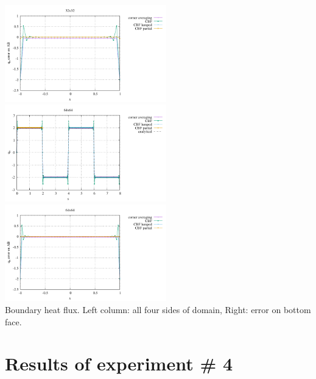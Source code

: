 \begin{center}
\includegraphics[width=7cm]{python_codes/fieldstone_173/results/exp3/heat_flux_boundary_bottom_32.pdf}\\
\includegraphics[width=7cm]{python_codes/fieldstone_173/results/exp3/heat_flux_boundary_64.pdf}
\includegraphics[width=7cm]{python_codes/fieldstone_173/results/exp3/heat_flux_boundary_bottom_64.pdf}\\
{\captionfont Boundary heat flux. Left column: all four sides of domain, Right: error on bottom face.}
\end{center}


\newpage
\section*{Results of experiment \# 4}

